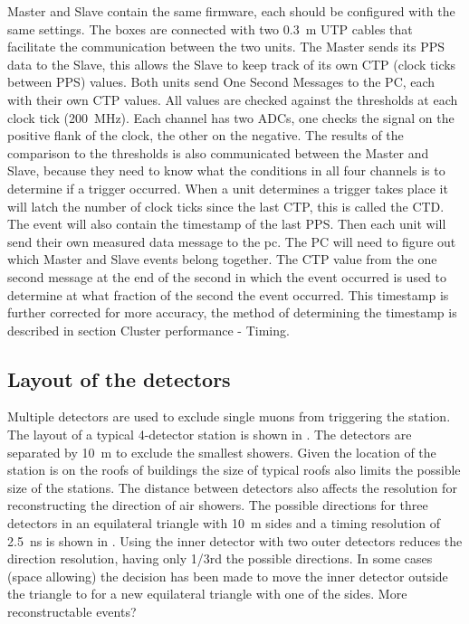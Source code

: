 Master and Slave contain the same firmware, each should be configured
with the same settings. The boxes are connected with two
\SI{0.3}{\meter} UTP cables that facilitate the communication between
the two units. The Master sends its PPS data to the Slave, this allows
the Slave to keep track of its own CTP (clock ticks between PPS) values.
Both units send One Second Messages to the PC, each with their own CTP
values. All \adc values are checked against the thresholds at each clock
tick (\SI{200}{\mega\hertz}). Each channel has two ADCs, one checks the
signal on the positive flank of the clock, the other on the negative.
The results of the comparison to the thresholds is also communicated
between the Master and Slave, because they need to know what the
conditions in all four channels is to determine if a trigger occurred.
When a unit determines a trigger takes place it will latch the number of
clock ticks since the last CTP, this is called the CTD. The event will
also contain the timestamp of the last PPS. Then each unit will send
their own measured data message to the pc. The PC will need to figure
out which Master and Slave events belong together. The CTP value from
the one second message at the end of the second in which the event
occurred is used to determine at what fraction of the second the
event occurred. This timestamp is further corrected for more accuracy, the method of determining the \gps timestamp is described in section Cluster performance - Timing.


\subsection{Layout of the detectors}

Multiple detectors are used to exclude single muons from triggering the station. The layout of a  typical 4-detector station is shown in . The detectors are separated by \SI{10}{\meter} to exclude the smallest showers. Given the location of the station is on the roofs of buildings the size of typical roofs also limits the possible size of the stations. The distance between detectors also affects the resolution for reconstructing the direction of air showers. The possible directions for three detectors in an equilateral triangle with \SI{10}{\meter} sides and a timing resolution of \SI{2.5}{\nano\second} is shown in . Using the inner detector with two outer detectors reduces the direction resolution, having only 1/3rd the possible directions. In some cases (space allowing) the decision has been made to move the inner detector outside the triangle to for a new equilateral triangle with one of the sides. More reconstructable events?

